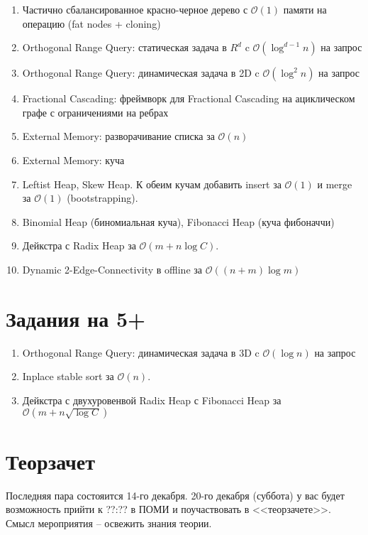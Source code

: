 \documentclass[12pt]{article}
\def\O{\mathcal{O}}
\newenvironment{MyList}{
  \begin{enumerate}
  \setlength{\parskip}{-5pt}
  \setlength{\itemsep}{5pt}
}{
  \vspace*{-1em}
  \end{enumerate}
}
\newcommand\Section[1]{\vspace*{-1em}\section{#1}}
\begin{document}
\begin{MyList}
\item Частично сбалансированное красно-черное дерево с $\O(1)$ памяти на операцию (fat nodes + cloning)
\item Orthogonal Range Query: статическая задача в $R^d$ c $\O(\log^{d-1}n)$ на запрос
\item Orthogonal Range Query: динамическая задача в 2D c $\O(\log^2 n)$ на запрос
\item Fractional Cascading: фреймворк для Fractional Cascading на ациклическом графе с ограничениями на ребрах
\item External Memory: разворачивание списка за $\O(n)$
\item External Memory: куча
\item Leftist Heap, Skew Heap. К обеим кучам добавить insert за $\O(1)$ и merge за $\O(1)$ (bootstrapping).
\item Binomial Heap (биномиальная куча), Fibonacci Heap (куча фибоначчи)
\item Дейкстра с Radix Heap за $\O(m + n \log C)$.
\item Dynamic 2-Edge-Connectivity в offline за $\O((n+m)\log m)$
\end{MyList}
\Section{Задания на 5+}
\begin{MyList}
\item Orthogonal Range Query: динамическая задача в 3D c $\O(\log n)$ на запрос
\item Inplace stable sort за $\O(n)$.
\item Дейкстра с двухуровенвой Radix Heap с Fibonacci Heap за $\O(m + n\sqrt{\log C})$
\end{MyList}

\Section{Теорзачет}

Последняя пара состояится 14-го декабря.
20-го декабря (суббота) у вас будет возможность прийти к
??:?? в ПОМИ и поучаствовать в <<теорзачете>>.
Смысл мероприятия -- освежить знания теории.
\end{document}
